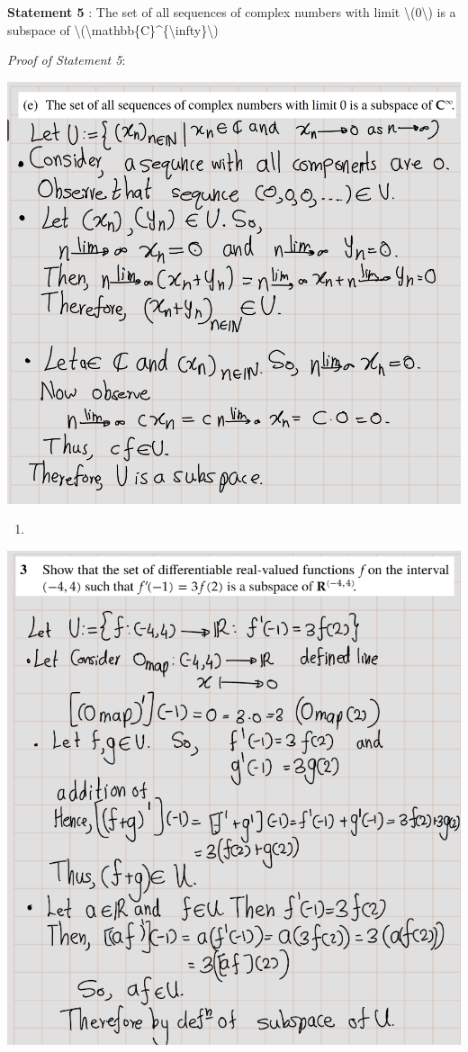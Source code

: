 \documentclass[
]{book}
\providecommand{\tightlist}{%
  \setlength{\itemsep}{0pt}\setlength{\parskip}{0pt}}
\theoremstyle{definition}
\theoremstyle{definition}
\theoremstyle{definition}
\theoremstyle{definition}
\theoremstyle{remark}
\begin{document}
\textbf{Statement 5} : The set of all sequences of complex numbers with limit \textbackslash(0\textbackslash) is a subspace of \textbackslash(\textbackslash mathbb\{C\}\^{}\{\textbackslash infty\}\textbackslash)

\emph{Proof of Statement 5}:

\includegraphics{fig/Ex1C/Ex2-e.png}

\begin{enumerate}
\def\labelenumi{\arabic{enumi}.}
\setcounter{enumi}{2}
\tightlist
\item
\end{enumerate}

\includegraphics{fig/Ex1C/Ex3.png}
\end{document}
